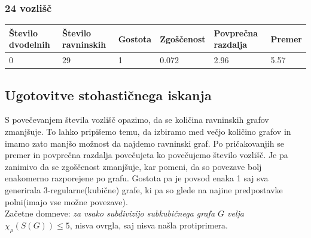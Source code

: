 \documentclass[11pt,a4paper,titlepage]{article}
\begin{document}
\subsubsection{24 vozlišč}
\begin{table}[H]
	\begin{tabular}{|l|l|l|l|l|l|}
		\hline
		Število dvodelnih	& Število ravninskih  & Gostota  & Zgoščenost & Povprečna razdalja & Premer \\ \hline
		0 & 29  & 1 & 0.072 & 2.96 & 5.57 \\ \hline
	\end{tabular}
\end{table}

\subsection{Ugotovitve stohastičnega iskanja}
S povečevanjem števila vozlišč opazimo, da se količina ravninskih grafov zmanjšuje. To lahko pripišemo temu, da izbiramo med večjo količino grafov in imamo zato manjšo možnost da najdemo ravninski graf. Po pričakovanjih se premer in povprečna razdalja povečujeta ko povečujemo število vozlišč. Je pa zanimivo da se zgoščenost zmanjšuje, kar pomeni, da so povezave bolj enakomerno razporejene po grafu. Gostota pa je povsod enaka 1 saj sva generirala 3-regularne(kubične) grafe, ki pa so glede na najine predpostavke polni(imajo vse možne povezave). \\
Začetne domneve: \emph{za vsako subdivizijo subkubičnega grafa $G$ velja $\chi_\rho(S(G)) \leq 5$}, nisva ovrgla, saj nisva našla protiprimera.

\nocite{*}

\printbibliography
\end{document}
